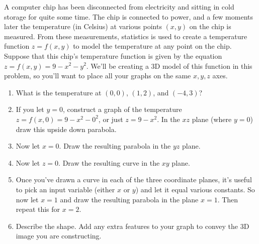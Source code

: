\begin{problem}\label{surface graph for a function of two variables}%
%
%
 A computer chip has been disconnected from electricity and sitting in cold storage for quite some time.  The chip is connected to power, and a few moments later the temperature (in Celsius) at various points $(x,y)$ on the chip is measured. From these measurements, statistics is used to create a temperature function $z=f(x,y)$ to model the temperature at any point on the chip. Suppose that this chip's temperature function is given by the equation $z=f(x,y)=9-x^2-y^2$. We'll be creating a 3D model of this function in this problem, so you'll want to place all your graphs on the same $x,y,z$ axes.
\begin{enumerate}
 \item What is the temperature at $(0,0)$, $(1,2)$, and $(-4,3)$? 
 \item If you let $y=0$, construct a graph of the temperature $z=f(x,0) = 9-x^2-0^2$, or just $z=9-x^2$. In the $xz$ plane (where $y=0$) draw this upside down parabola.
 \item Now let $x=0$. Draw the resulting parabola in the $yz$ plane.
 \item Now let $z=0$. Draw the resulting curve in the $xy$ plane.
 \item Once you've drawn a curve in each of the three coordinate planes, it's useful to pick an input variable (either $x$ or $y$) and let it equal various constants. So now let $x=1$ and draw the resulting parabola in the plane $x=1$.  Then repeat this for $x=2$.
 \item Describe the shape. Add any extra features to your graph to convey the 3D image you are constructing. 
\end{enumerate}
\end{problem}

